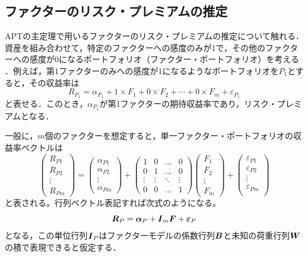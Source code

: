 ﻿\documentclass[11pt]{jreport}
\begin{document}
\subsection{ファクターのリスク・プレミアムの推定}
APTの主定理で用いるファクターのリスク・プレミアムの推定について触れる．
資産を組み合わせて，特定のファクターへの感度のみが1で，その他のファクターへの感度が0になるポートフォリオ（ファクター・ポートフォリオ）を考える ．例えば，第1ファクターのみへの感度が1になるようなポートフォリオを$P_1$とすると，その収益率は
\begin{equation}
R_{P_1} = \alpha_{P_1} + 1\times F_1 + 0\times F_2 + \cdots + 0\times F_m + \varepsilon_{P_1} 
\end{equation}
と表せる．このとき，$\alpha_{P_1}$が第1ファクターの期待収益率であり，リスク・プレミアムとなる．

一般に，$m$個のファクターを想定すると，単一ファクター・ポートフォリオの収益率ベクトルは
\begin{equation}
\left(
	\begin{array}{cccc}
	R_{P1}\\
	R_{P2}\\
	\vdots \\
	R_{Pm}
	\end{array}
\right)
=
\left(
	\begin{array}{cccc}
	\alpha_{P1}\\
	\alpha_{P2}\\
	\vdots \\
	\alpha_{Pm}
	\end{array}
\right)
+
\left(
	\begin{array}{cccc}
	1 & 0 & \ldots & 0\\
	0 & 1 & \ldots & 0\\
	\vdots & \vdots & \ddots & \vdots \\
	0 & 0 & \ldots & 1
	\end{array}
\right)
\left(
	\begin{array}{cccc}
	F_1 \\
	F_2 \\
	\vdots \\
	F_m
	\end{array}
\right)
+
\left(
	\begin{array}{cccc}
	\varepsilon_{P1}\\
	\varepsilon_{P2}\\
	\vdots \\
	\varepsilon_{Pm}\\
	\end{array}
\right)
\end{equation}
と表される。行列ベクトル表記すれば次式のようになる。
\begin{equation}
\mbox{\boldmath $R$}_P = \mbox{\boldmath $\alpha$}_P + \mbox{\boldmath $I$}_m\mbox{\boldmath $F$} + \mbox{\boldmath $\varepsilon$}_P
\end{equation}
となる，この単位行列$\mbox{\boldmath $I$}_P$はファクターモデルの係数行列$\mbox{\boldmath $B$}$と未知の荷重行列$\mbox{\boldmath $W$}$の積で表現できると仮定する．
\end{document}
